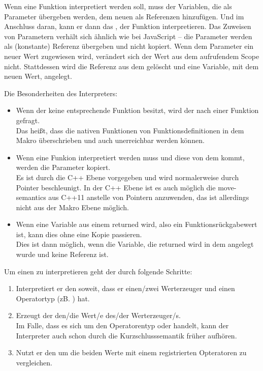 {      Wenn eine Funktion interpretiert werden soll, muss der  Variablen, die als Parameter übergeben werden, dem neuen  als Referenzen hinzufügen. Und im Anschluss daran, kann er dann das , der Funktion interpretieren. Das Zuweisen von Parametern verhält sich ähnlich wie bei JavaScript -- die Parameter werden als (konstante) Referenz übergeben und nicht kopiert. Wenn dem Parameter ein neuer Wert zugewiesen wird, verändert sich der Wert aus dem aufrufendem Scope nicht. Stattdessen wird die Referenz aus dem  gelöscht und eine Variable, mit dem neuen Wert, angelegt.

      Die Besonderheiten des Interpreters:
      \begin{itemize}
        \item Wenn der  keine entsprechende Funktion besitzt, wird der  nach einer Funktion gefragt.\\
          Das heißt, dass die nativen Funktionen von Funktionsdefinitionen in dem Makro überschrieben und auch unerreichbar werden können.
        \item Wenn eine Funkion interpretiert werden muss und diese von dem  kommt, werden die Parameter kopiert.\\
          Es ist durch die C++ Ebene vorgegeben und wird normalerweise durch Pointer beschleunigt. In der C++ Ebene ist es auch möglich die move-semantics aus C++11 anstelle von Pointern anzuwenden, das ist allerdings nicht aus der Makro Ebene möglich.
        \item Wenn eine Variable aus einem  returned wird, also ein Funktionsrückgabewert ist, kann dies ohne eine Kopie passieren.\\
          Dies ist dann möglich, wenn die Variable, die returned wird in dem  angelegt wurde und keine Referenz ist.
      \end{itemize}

      Um einen  zu interpretieren geht der  durch folgende Schritte:
      \begin{enumerate}
        \item Interpretiert er den   soweit, dass er einen/zwei Werterzeuger und einen Operatortyp (zB. \myMinin{==}) hat.
        \item Erzeugt der  den/die Wert/e des/der Werterzeuger/s.\\
          Im Falle, dass es sich um den Operatorentyp \myMinin{&&} oder \myMinin{||} handelt, kann der Interpreter auch schon durch die Kurzschlusssemantik früher aufhören.
        \item Nutzt er den  um die beiden Werte mit einem registrierten Opteratoren zu vergleichen.
      \end{enumerate}

}
